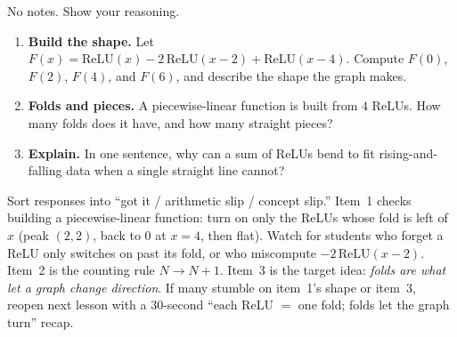 \documentclass[10pt]{article}
\newcommand{\relu}{\mathrm{ReLU}}
\begin{document}
\namedateperiod

\vspace{0.15in}

No notes. Show your reasoning.

\begin{enumerate}[leftmargin=1.8em, itemsep=16pt]
  \item \textbf{Build the shape.} Let $F(x)=\relu(x)-2\,\relu(x-2)+\relu(x-4)$. Compute
        $F(0)$, $F(2)$, $F(4)$, and $F(6)$, and describe the shape the graph makes.
  \item \textbf{Folds and pieces.} A piecewise-linear function is built from $4$ ReLUs. How many folds does
        it have, and how many straight pieces?
  \item \textbf{Explain.} In one sentence, why can a sum of ReLUs bend to fit rising-and-falling data when a
        single straight line cannot?
\end{enumerate}

\begin{teachernote}
Sort responses into ``got it / arithmetic slip / concept slip.'' Item~1 checks building a piecewise-linear
function: turn on only the ReLUs whose fold is left of $x$ (peak $(2,2)$, back to $0$ at $x=4$, then flat).
Watch for students who forget a ReLU only switches on past its fold, or who miscompute $-2\,\relu(x-2)$.
Item~2 is the counting rule $N\to N+1$. Item~3 is the target idea: \emph{folds are what let a graph change
direction}. If many stumble on item~1's shape or item~3, reopen next lesson with a 30-second ``each ReLU $=$
one fold; folds let the graph turn'' recap.
\end{teachernote}
\end{document}
